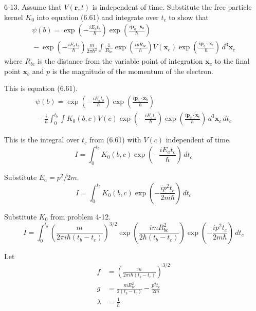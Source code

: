 \documentclass[12pt]{article}
\begin{document}
6-13.
Assume that $V(\mathbf r,t)$ is independent of time.
Substitute the free particle kernel $K_0$ into equation
(6.61) and integrate over $t_c$ to show that
\begin{multline*}
\psi(b)=
\exp\left(-\frac{iE_at_b}{\hbar}\right)
\exp\left(\frac{i\mathbf p_a\cdot\mathbf x_b}{\hbar}\right)
\\
{}-\exp\left(-\frac{iE_at_b}{\hbar}\right)
\frac{m}{2\pi\hbar^2}
\int
\frac{1}{R_{bc}}
\exp\left(\frac{ipR_{bc}}{\hbar}\right)
V(\mathbf x_c)
\exp\left(\frac{i\mathbf p_a\cdot\mathbf x_c}{\hbar}\right)
\,d^3\mathbf x_c
\tag{6.62}
\end{multline*}
where $R_{bc}$ is the distance from the variable point of integration
$\mathbf x_c$ to the final point $\mathbf x_b$ and $p$ is the
magnitude of the momentum of the electron.

\bigskip
This is equation (6.61).
\begin{multline*}
\psi(b)=
\exp\left(-\frac{iE_at_b}{\hbar}\right)
\exp\left(\frac{i\mathbf p_a\cdot\mathbf x_b}{\hbar}\right)
\\
{}-\frac{i}{\hbar}\int_0^{t_b}\int
K_0(b,c)V(c)
\exp\left(-\frac{iE_at_c}{\hbar}\right)
\exp\left(\frac{i\mathbf p_a\cdot\mathbf x_c}{\hbar}\right)
\,d^3\mathbf x_c\,dt_c
\tag{6.61}
\end{multline*}

This is the integral over $t_c$ from (6.61) with $V(c)$ independent of time.
\begin{equation*}
I=\int_0^{t_b}K_0(b,c)
\exp\left(-\frac{iE_at_c}{\hbar}\right)
\,dt_c
\end{equation*}

Substitute $E_a=p^2/2m$.
\begin{equation*}
I=\int_0^{t_b}K_0(b,c)
\exp\left(-\frac{ip^2t_c}{2m\hbar}\right)
\,dt_c
\end{equation*}

Substitute $K_0$ from problem 4-12.
\begin{equation*}
I=\int_0^{t_b}
\left(\frac{m}{2\pi i\hbar(t_b-t_c)}\right)^{3/2}
\exp\left(\frac{imR_{bc}^2}{2\hbar(t_b-t_c)}\right)
\exp\left(-\frac{ip^2t_c}{2m\hbar}\right)
\,dt_c
\end{equation*}

Let
\begin{align*}
f&=\left(\frac{m}{2\pi i\hbar(t_b-t_c)}\right)^{3/2}
\\
g&=\frac{m R_{bc}^2}{2(t_b-t_c)}-\frac{p^2t_c}{2m}
\\
\lambda&=\frac{1}{\hbar}
\end{align*}
\end{document}
